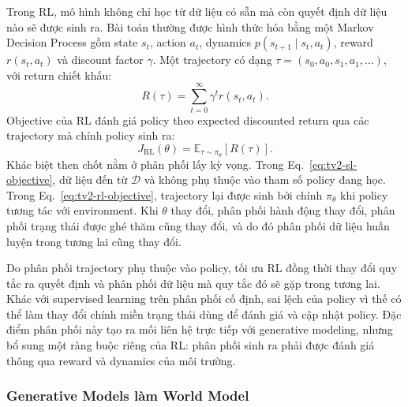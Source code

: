 Trong RL, mô hình không chỉ học từ dữ liệu có sẵn mà còn quyết định dữ liệu nào sẽ được sinh ra.
Bài toán thường được hình thức hóa bằng một Markov Decision Process gồm state $s_t$, action $a_t$, dynamics $p(s_{t+1}\mid s_t,a_t)$, reward $r(s_t,a_t)$ và discount factor $\gamma$.
Một trajectory có dạng $\tau=(s_0,a_0,s_1,a_1,\ldots)$, với return chiết khấu:
\begin{equation}
    R(\tau)
    =
    \sum_{t=0}^{\infty}
    \gamma^t r(s_t,a_t).
    \label{eq:tv2-return}
\end{equation}
Objective của RL đánh giá policy theo expected discounted return qua các trajectory mà chính policy sinh ra:
\begin{equation}
    J_{\mathrm{RL}}(\theta)
    =
    \mathbb{E}_{\tau\sim\pi_\theta}
    \left[
        R(\tau)
    \right].
    \label{eq:tv2-rl-objective}
\end{equation}
Khác biệt then chốt nằm ở phân phối lấy kỳ vọng.
Trong Eq.~\eqref{eq:tv2-sl-objective}, dữ liệu đến từ $\mathcal{D}$ và không phụ thuộc vào tham số policy đang học.
Trong Eq.~\eqref{eq:tv2-rl-objective}, trajectory lại được sinh bởi chính $\pi_\theta$ khi policy tương tác với environment.
Khi $\theta$ thay đổi, phân phối hành động thay đổi, phân phối trạng thái được ghé thăm cũng thay đổi, và do đó phân phối dữ liệu huấn luyện trong tương lai cũng thay đổi.

Do phân phối trajectory phụ thuộc vào policy, tối ưu RL đồng thời thay đổi quy tắc ra quyết định và phân phối dữ liệu mà quy tắc đó sẽ gặp trong tương lai.
Khác với supervised learning trên phân phối cố định, sai lệch của policy vì thế có thể làm thay đổi chính miền trạng thái dùng để đánh giá và cập nhật policy.
Đặc điểm phân phối này tạo ra mối liên hệ trực tiếp với generative modeling, nhưng bổ sung một ràng buộc riêng của RL: phân phối sinh ra phải được đánh giá thông qua reward và dynamics của môi trường.

\subsubsection{Generative Models làm World Model}

